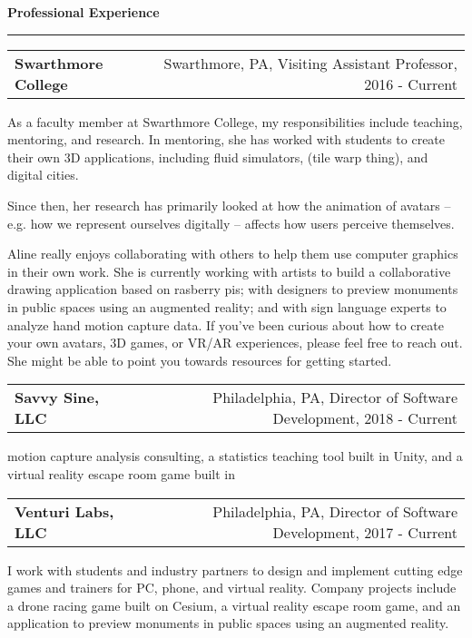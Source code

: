 \needspace{6em}
{\Large {\bf Professional Experience}} 
\vspace{0.1cm}
\hrule
\medskip

\needspace{6em}
\begin{tabular*}{7.1in}{@{}l@{\extracolsep\fill}r}
{\large {\bf Swarthmore College}} & Swarthmore, PA, Visiting Assistant Professor, 2016 - Current\\
\end{tabular*}

As a faculty member at Swarthmore College, my responsibilities include
teaching, mentoring, and research. In mentoring, she has worked with students to create 
their own 3D applications, including fluid simulators, (tile warp thing), and digital cities. 

Since then, her research has primarily looked at how the
animation of avatars -- e.g. how we represent ourselves digitally -- affects
how users perceive themselves.

Aline really enjoys collaborating with others to help them use computer
graphics in their own work. She is currently working with artists to build a
collaborative drawing application based on rasberry pis; with designers to
preview monuments in public spaces using an augmented reality; and with sign
language experts to analyze hand motion capture data. If you've been curious
about how to create your own avatars, 3D games, or VR/AR experiences, please
feel free to reach out. She might be able to point you towards resources for
getting started. 

\medskip
\medskip

\needspace{6em}
\begin{tabular*}{7.1in}{@{}l@{\extracolsep\fill}r}
{\large {\bf Savvy Sine, LLC}} & Philadelphia, PA, Director of Software Development, 2018 - Current\\
\end{tabular*}

motion capture analysis consulting, a statistics
teaching tool built in Unity, and a virtual reality escape room game built in

\needspace{6em}
\begin{tabular*}{7.1in}{@{}l@{\extracolsep\fill}r}
{\large {\bf Venturi Labs, LLC}} & Philadelphia, PA, Director of Software Development, 2017 - Current\\
\end{tabular*}

I work with students and industry partners to design and implement cutting edge
games and trainers for PC, phone, and virtual reality. Company projects include
a drone racing game built on Cesium, a virtual reality escape room game, and an
application  to preview monuments in public spaces using an augmented reality.

